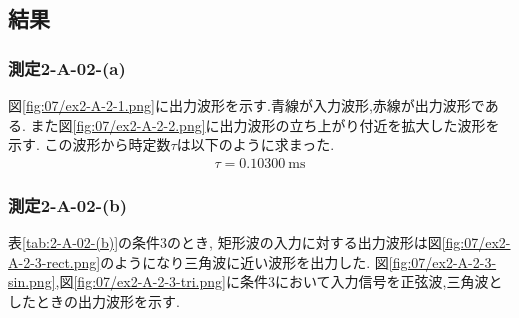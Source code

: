 \subsection{結果}
\subsubsection{測定2-A-02-(a)}
図\ref{fig:07/ex2-A-2-1.png}に出力波形を示す.青線が入力波形,赤線が出力波形である.
また図\ref{fig:07/ex2-A-2-2.png}に出力波形の立ち上がり付近を拡大した波形を示す.
この波形から時定数$\tau$は以下のように求まった.
\begin{align}
  \tau=0.10300\ \si{\milli\second}
\end{align}
\subsubsection{測定2-A-02-(b)}
表\ref{tab:2-A-02-(b)}の条件3のとき,
矩形波の入力に対する出力波形は図\ref{fig:07/ex2-A-2-3-rect.png}のようになり三角波に近い波形を出力した.
図\ref{fig:07/ex2-A-2-3-sin.png},図\ref{fig:07/ex2-A-2-3-tri.png}に条件3において入力信号を正弦波,三角波としたときの出力波形を示す.

